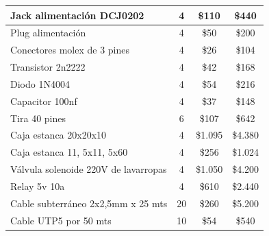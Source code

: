 \documentclass[
11pt, %
codirector, %
]{charter}
\begin{document}
\begin{table}[htpb]
\begin{tabularx}{\linewidth}{@{}|X|c|r|r|@{}}
 Jack alimentación DCJ0202&
  \multicolumn{1}{c|}{4} &
  \multicolumn{1}{c|}{\$110} &
  \multicolumn{1}{c|}{\$440} \\ \hline
 
 Plug alimentación&
  \multicolumn{1}{c|}{4} &
  \multicolumn{1}{c|}{\$50} &
  \multicolumn{1}{c|}{\$200} \\ \hline
 
 Conectores molex de 3 pines&
  \multicolumn{1}{c|}{4} &
  \multicolumn{1}{c|}{\$26} &
  \multicolumn{1}{c|}{\$104} \\ \hline

 Transistor 2n2222&
  \multicolumn{1}{c|}{4} &
  \multicolumn{1}{c|}{\$42} &
  \multicolumn{1}{c|}{\$168} \\ \hline

 Diodo 1N4004&
  \multicolumn{1}{c|}{4} &
  \multicolumn{1}{c|}{\$54} &
  \multicolumn{1}{c|}{\$216} \\ \hline

 Capacitor 100nf&
  \multicolumn{1}{c|}{4} &
  \multicolumn{1}{c|}{\$37} &
  \multicolumn{1}{c|}{\$148} \\ \hline

 Tira 40 pines&
  \multicolumn{1}{c|}{6} &
  \multicolumn{1}{c|}{\$107} &
  \multicolumn{1}{c|}{\$642} \\ \hline

 Caja estanca 20x20x10&
  \multicolumn{1}{c|}{4} &
  \multicolumn{1}{c|}{\$1.095} &
  \multicolumn{1}{c|}{\$4.380} \\ \hline

 Caja estanca 11, 5x11, 5x60&
  \multicolumn{1}{c|}{4} &
  \multicolumn{1}{c|}{\$256} &
  \multicolumn{1}{c|}{\$1.024} \\ \hline

Válvula solenoide 220V de lavarropas&
  \multicolumn{1}{c|}{4} &
  \multicolumn{1}{c|}{\$1.050} &
  \multicolumn{1}{c|}{\$4.200} \\ \hline

 Relay 5v 10a&
  \multicolumn{1}{c|}{4} &
  \multicolumn{1}{c|}{\$610} &
  \multicolumn{1}{c|}{\$2.440} \\ \hline
  
 Cable subterráneo 2x2,5mm x 25 mts&
  \multicolumn{1}{c|}{20} &
  \multicolumn{1}{c|}{\$260} &
  \multicolumn{1}{c|}{\$5.200} \\ \hline
  
  Cable UTP5 por 50 mts&
  \multicolumn{1}{c|}{10} &
  \multicolumn{1}{c|}{\$54} &
  \multicolumn{1}{c|}{\$540} \\ \hline
  

\end{tabularx}
\end{table}
\end{document}
